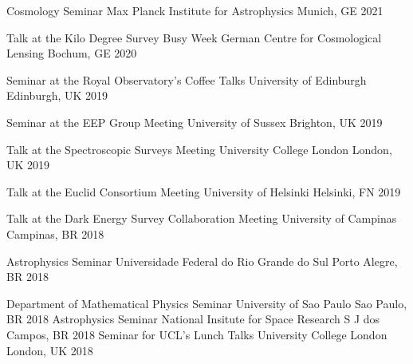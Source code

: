 

\begin{cvhonors}
  \cvhonor
    {Cosmology Seminar} %
    {Max Planck Institute for Astrophysics} %
    {Munich, GE} %
    {2021} %

  \cvhonor
    {Talk at the Kilo Degree Survey Busy Week} %
    {German Centre for Cosmological Lensing} %
    {Bochum, GE} %
    {2020} %

  \cvhonor
    {Seminar at the Royal Observatory's Coffee Talks} %
    {University of Edinburgh} %
    {Edinburgh, UK} %
    {2019} %

  \cvhonor
    {Seminar at the EEP Group Meeting} %
    {University of Sussex} %
    {Brighton, UK} %
    {2019} %
    
  \cvhonor
    {Talk at the Spectroscopic Surveys Meeting} %
    {University College London} %
    {London, UK} %
    {2019} %

  \cvhonor
    {Talk at the Euclid Consortium Meeting} %
    {University of Helsinki} %
    {Helsinki, FN} %
    {2019} %

  \cvhonor
    {Talk at the Dark Energy Survey Collaboration Meeting} %
    {University of Campinas} %
    {Campinas, BR} %
    {2018}

  \cvhonor
    {Astrophysics Seminar} %
    {Universidade Federal do Rio Grande do Sul} %
    {Porto Alegre, BR} %
    {2018} %
    
  \cvhonor
    {Department of Mathematical Physics Seminar} %
    {University of Sao Paulo} %
    {Sao Paulo, BR} %
    {2018} %
  \cvhonor
    {Astrophysics Seminar} %
    {National Insitute for Space Research} %
    {S J dos Campos, BR} %
    {2018} %
  \cvhonor
    {Seminar for UCL's Lunch Talks} %
    {University College London} %
    {London, UK} %
    {2018} %


\end{cvhonors}
